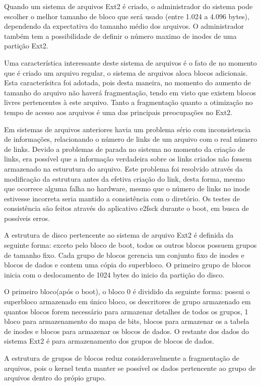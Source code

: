 Quando um sistema de arquivos Ext2 é criado, o administrador do sistema pode escolher o melhor tamanho de bloco que será usado (entre 1.024 a 4.096 bytes), dependendo da expectativa do tamanho médio dos arquivos. O administrador também tem a possibilidade de definir o número maximo de inodes de uma partição Ext2.

Uma característica interessante deste sistema de arquivos é o fato de no momento que é criado um arquivo regular, o sistema de arquivos aloca blocos adicionais. Esta caracterísitca foi adotada, pois desta maneira, no momento do aumento de tamanho do arquivo não haverá fragmentação, tendo em visto que existem blocos livres pertencentes à este arquivo. Tanto a fragmentação quanto a otimização no tempo de acesso aos arquivos é uma das principais preocupações no Ext2.

Em sistemas de arquivos anteriores havia um problema sério com inconsistencia de informações, relacionando o número de links de um arquivo com o real número de links. Devido a problemas de parada no sistema no momento da criação de links, era possível que a informação verdadeira sobre os links criados não fossem armazenado na esturutura do arquivo. Este problema foi resolvido através da modificação da estrutura antes da efetiva criação do link, desta forma, mesmo que ocorrece alguma falha no hardware, mesmo que o número de links no inode estivesse incorreta seria mantido a consistência com o diretório. Os testes de consistência são feitos através do aplicativo e2fsck durante o boot, em busca de possíveis erros.

A estrutura de disco pertencente ao sistema de arquivo Ext2 é definida da seguinte forma: exceto pelo bloco de boot, todos os outros blocos possuem grupos de tamanho fixo. Cada grupo de blocos gerencia um conjunto fixo de inodes e blocos de dados e contem uma cópia do superbloco. O primeiro grupo de blocos inicia com o deslocamento de 1024 bytes do inicio da partição do disco.

O primeiro bloco(após o boot), o bloco 0 é dividido da seguinte forma: possui o superbloco armazenado em único bloco, os descritores de grupo armazenado em quantos blocos forem necessário para armazenar detalhes de todos os grupos, 1 bloco para armazenamento do mapa de bits, blocos para armazenar os a tabela de inodes e blocos para armazenar os blocos de dados.  O restante dos dados do sistema Ext2 é para armazenamento dos grupos de blocos de dados.

A estrutura de grupos de blocos reduz consideravelmente a fragmentação de arquivos, pois o kernel tenta manter se possível os dados pertencente ao grupo de arquivos dentro do própio grupo.

